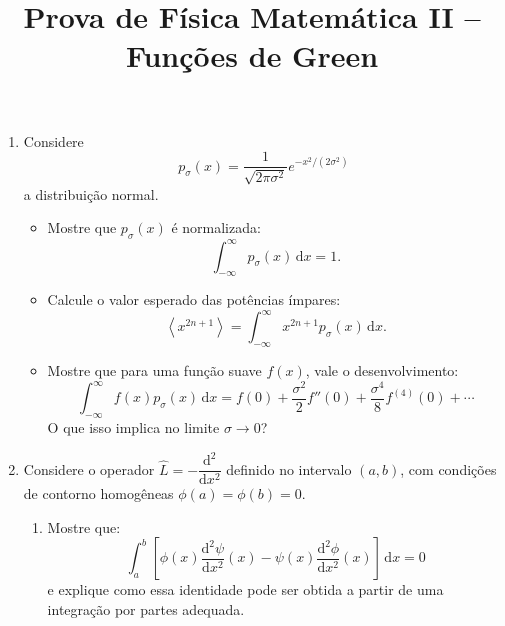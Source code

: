 \newif\ifuseseminar
\useseminartrue


\title{Prova de Física Matemática II -- Funções de Green}



\begin{enumerate}
	\item Considere
	      $$
		      p_\sigma(x) = \frac{1}{\sqrt{2\pi\sigma^2}} e^{-x^2 / (2\sigma^2)}
	      $$
	      a distribuição normal.

	      \begin{itemize}
		      \item[(a)] Mostre que $p_\sigma(x)$ é normalizada:
		            $$
			            \int_{-\infty}^{\infty} p_\sigma(x)\,\mathrm{d}x = 1.
		            $$

		      \item[(b)] Calcule o valor esperado das potências ímpares:
		            $$
			            \left\langle x^{2n+1} \right\rangle = \int_{-\infty}^{\infty} x^{2n+1} p_\sigma(x)\,\mathrm{d}x.
		            $$

		      \item[(c)] Mostre que para uma função suave $f(x)$, vale o desenvolvimento:
		            $$
			            \int_{-\infty}^{\infty} f(x) p_\sigma(x)\,\mathrm{d}x =
			            f(0) + \frac{\sigma^2}{2} f''(0) + \frac{\sigma^4}{8} f^{(4)}(0) + \cdots
		            $$
		            O que isso implica no limite $\sigma \to 0$?
	      \end{itemize}
	\item Considere o operador $\hat{L} = -\dfrac{\mathrm{d}^2}{\mathrm{d}x^2}$ definido no intervalo $(a, b)$, com condições de contorno homogêneas $\phi(a) = \phi(b) = 0$.

	      \begin{enumerate}
		      \item Mostre que:
		            $$
			            \int_a^b \left[\phi(x) \frac{\mathrm{d}^2\psi}{\mathrm{d}x^2}(x) -
				            \psi(x) \frac{\mathrm{d}^2\phi}{\mathrm{d}x^2}(x)\right]\,\mathrm{d}x = 0
		            $$
		            e explique como essa identidade pode ser obtida a partir de uma integração por partes adequada.


\end{enumerate}
\end{enumerate}

